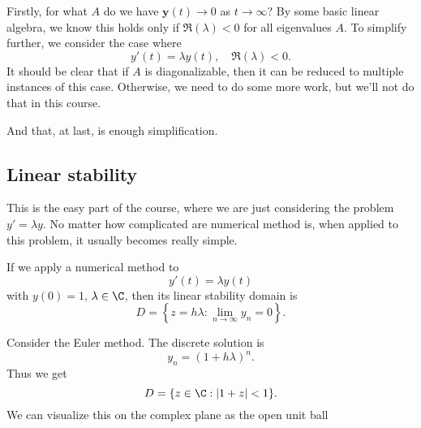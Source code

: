 \documentclass[a4paper]{article}
\begin{document}
Firstly, for what $A$ do we have $\mathbf{y}(t) \to 0$ as $t \to \infty$? By some basic linear algebra, we know this holds only if $\Re(\lambda) < 0$ for all eigenvalues $A$. To simplify further, we consider the case where
\[
  y'(t) = \lambda y(t),\quad \Re(\lambda) < 0.
\]
It should be clear that if $A$ is diagonalizable, then it can be reduced to multiple instances of this case. Otherwise, we need to do some more work, but we'll not do that in this course.

And that, at last, is enough simplification.

\subsection{Linear stability}
This is the easy part of the course, where we are just considering the problem $y' = \lambda y$. No matter how complicated are numerical method is, when applied to this problem, it usually becomes really simple.

\begin{defi}
  If we apply a numerical method to
  \[
    y'(t) = \lambda y(t)
  \]
  with $y(0) = 1$, $\lambda \in \C$, then its linear stability domain is
  \[
    D = \left\{z = h\lambda: \lim_{n \to \infty} y_n = 0\right\}.
  \]
\end{defi}

\begin{eg}
  Consider the Euler method. The discrete solution is
  \[
    y_n = (1 + h\lambda)^n.
  \]
  Thus we get
  \[
    D = \{z \in \C: |1 + z| < 1\}.
  \]
  We can visualize this on the complex plane as the open unit ball
  \begin{center}
  \end{center}
\end{eg}
\end{document}
